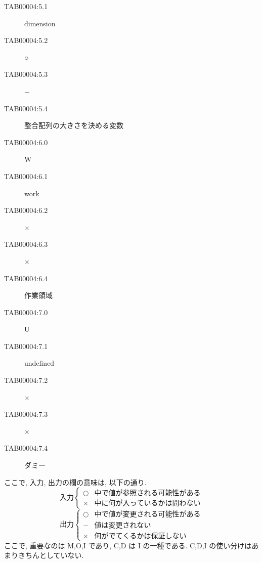\begin{enumerate}
\begin{center}
\begin{description}
\item[TAB00004:5.1] dimension
\item[TAB00004:5.2] ○
\item[TAB00004:5.3] −
\item[TAB00004:5.4] 整合配列の大きさを決める変数
\item[TAB00004:6.0] W
\item[TAB00004:6.1] work
\item[TAB00004:6.2] ×
\item[TAB00004:6.3] ×
\item[TAB00004:6.4] 作業領域
\item[TAB00004:7.0] U
\item[TAB00004:7.1] undefined
\item[TAB00004:7.2] ×
\item[TAB00004:7.3] ×
\item[TAB00004:7.4] ダミー
\end{description}

ここで, 入力, 出力の欄の意味は, 以下の通り.
\[
    入力 \left\{
    \begin{array}{ll}   
      ○ &  中で値が参照される可能性がある \\
      × &  中に何が入っているかは問わない
    \end{array}  
     \right.
\]
\[
    出力 \left\{
    \begin{array}{ll}   
      ○ &  中で値が変更される可能性がある \\
      − &  値は変更されない \\
      × &  何がでてくるかは保証しない
    \end{array}  
     \right.
\]
ここで, 重要なのは M,O,I であり, C,D は I の一種である.
C,D,I の使い分けはあまりきちんとしていない.
\end{center}



\end{enumerate}
